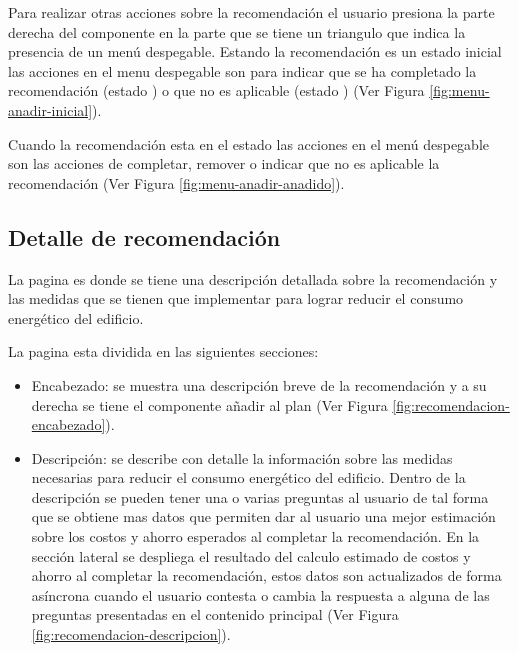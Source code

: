 Para realizar otras acciones sobre la recomendación el usuario presiona la parte
derecha del componente en la parte que se tiene un triangulo que indica la
presencia de un menú despegable.
Estando la recomendación es un estado inicial  las
acciones en el menu despegable son para indicar que se ha completado la recomendación
(estado ) o que no es aplicable
(estado ) (Ver Figura \ref{fig:menu-anadir-inicial}).


Cuando la recomendación esta en el estado  las
acciones en el menú despegable son las acciones de completar, remover o indicar
que no es aplicable la recomendación (Ver Figura \ref{fig:menu-anadir-anadido}).

\subsection{Detalle de recomendación}

La pagina  es donde se tiene una descripción
detallada sobre la recomendación y las medidas que se tienen que implementar para
lograr reducir el consumo energético del edificio.

La pagina esta dividida en las siguientes secciones:
\begin{itemize}
\item Encabezado: se muestra una descripción breve de la recomendación y a su
  derecha se tiene el componente añadir al plan (Ver Figura
  \ref{fig:recomendacion-encabezado}).
\item Descripción: se describe con detalle la información sobre las medidas
  necesarias para reducir el consumo energético del edificio.
  Dentro de la descripción se pueden tener una o varias preguntas al usuario
  de tal forma que se obtiene mas datos que permiten dar al usuario una mejor
  estimación sobre los costos y ahorro esperados al completar la recomendación.
  En la sección lateral se despliega el resultado del calculo estimado
  de costos y ahorro al completar la recomendación, estos datos son
  actualizados de forma asíncrona cuando el usuario contesta o cambia
  la respuesta a alguna de las preguntas presentadas en el contenido
  principal (Ver Figura \ref{fig:recomendacion-descripcion}).
\end{itemize}


